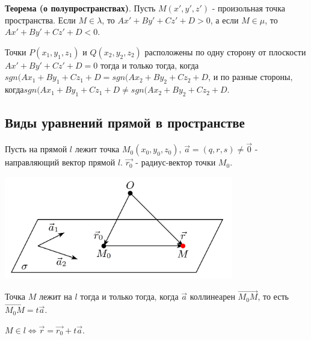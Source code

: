 \documentclass[a4paper]{article}
\begin{document}
\begin{htheorem}
\textbf{Теорема (о полупространствах)}. Пусть $M(x', y', z')$ - произольная точка пространства. Если $M \in \lambda$, то $Ax' + By' + Cz' + D > 0$, а если $M \in \mu$, то $Ax' + By' + Cz' + D < 0$.

Точки $P(x_1, y_1, z_1)$ и $Q(x_2, y_2, z_2)$ расположены по одну сторону от плоскости\newline $Ax' + By' + Cz' + D = 0$ тогда и только тогда, когда\newline $sgn(Ax_1 + By_1 +Cz_1+D = sgn(Ax_2 + By_2 + Cz_2 + D$, и по разные стороны, когда\newline $sgn(Ax_1 + By_1 +Cz_1+D \neq sgn(Ax_2 + By_2 + Cz_2 + D$.
\end{htheorem}


\newpage \begin{center}\begin{Large}\end{Large}\end{center}
\subsection*{Виды уравнений прямой в пространстве}

Пусть на прямой $l$ лежит точка $M_0(x_0,y_0,z_0)$, $\vec{a} = (q,r,s) \neq \vec{0}$ - направляющий вектор прямой $l$. $\vec{r_0}$ - радиус-вектор точки $M_0$.

\includegraphics[width=10cm]{t8}

Точка $M$ лежит на $l$ тогда и только тогда, когда $\vec{a}$ коллинеарен $\overrightarrow{M_0M}$, то есть $\overrightarrow{M_0M}  = t\vec{a}$.

$M \in l \Leftrightarrow \vec{r} = \vec{r_0} + t\vec{a}$.
\end{document}
